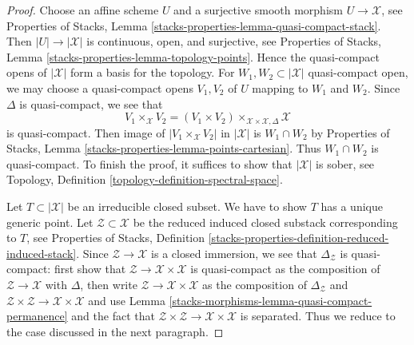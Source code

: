 \begin{proof}
Choose an affine scheme $U$ and a surjective smooth morphism
$U \to \mathcal{X}$, see
Properties of Stacks, Lemma \ref{stacks-properties-lemma-quasi-compact-stack}.
Then $|U| \to |\mathcal{X}|$ is continuous, open, and surjective, see
Properties of Stacks, Lemma \ref{stacks-properties-lemma-topology-points}.
Hence the quasi-compact opens of $|\mathcal{X}|$ form a basis
for the topology. For $W_1, W_2 \subset |\mathcal{X}|$ quasi-compact open,
we may choose a quasi-compact opens $V_1, V_2$ of $U$ mapping
to $W_1$ and $W_2$. Since $\Delta$ is quasi-compact,
we see that
$$
V_1 \times_\mathcal{X} V_2 =
(V_1 \times V_2) \times_{\mathcal{X} \times \mathcal{X}, \Delta} \mathcal{X}
$$
is quasi-compact. Then image of $|V_1 \times_\mathcal{X} V_2|$ in
$|\mathcal{X}|$ is $W_1 \cap W_2$ by
Properties of Stacks, Lemma \ref{stacks-properties-lemma-points-cartesian}.
Thus $W_1 \cap W_2$ is quasi-compact.
To finish the proof, it suffices to show that $|\mathcal{X}|$
is sober, see Topology, Definition \ref{topology-definition-spectral-space}.

\medskip\noindent
Let $T \subset |\mathcal{X}|$ be an irreducible closed subset.
We have to show $T$ has a unique generic point.
Let $\mathcal{Z} \subset \mathcal{X}$ be the reduced induced
closed substack corresponding to $T$, see
Properties of Stacks, Definition
\ref{stacks-properties-definition-reduced-induced-stack}.
Since $\mathcal{Z} \to \mathcal{X}$ is a closed immersion,
we see that $\Delta_\mathcal{Z}$ is quasi-compact:
first show that $\mathcal{Z} \to \mathcal{X} \times \mathcal{X}$
is quasi-compact as the composition of $\mathcal{Z} \to \mathcal{X}$
with $\Delta$, then write $\mathcal{Z} \to \mathcal{X} \times \mathcal{X}$
as the composition of $\Delta_\mathcal{Z}$ and
$\mathcal{Z} \times \mathcal{Z} \to \mathcal{X} \times \mathcal{X}$ and
use Lemma \ref{stacks-morphisms-lemma-quasi-compact-permanence}
and the fact that
$\mathcal{Z} \times \mathcal{Z} \to \mathcal{X} \times \mathcal{X}$
is separated. Thus we reduce to the case discussed in the next
paragraph.


\end{proof}
